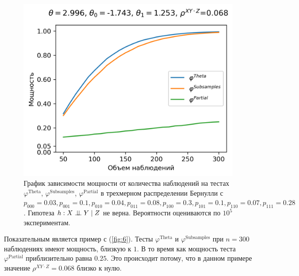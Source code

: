 \begin{figure}[H]
    \centering
    \includegraphics[scale=0.6]{images/graph6.png}
    \caption{График зависимости мощности от количества наблюдений
    на тестах $\varphi^{\text{Theta}}$, $\varphi^{\text{Subsamples}}$, $\varphi^{\text{Partial}}$
    в трехмерном распределении Бернулли с $p_{000}=0.03, p_{001}=0.1, 
    p_{010}=0.04, p_{011}=0.08,
    p_{100}=0.3, p_{101}=0.1, p_{110}=0.07, p_{111}=0.28$. 
    Гипотеза $h: X \perp\!\!\!\perp Y \mid Z$ не верна.
    Вероятности оцениваются по $10^5$ экспериментам.} \label{fig:6}
\end{figure}

Показательным является пример с (\autoref{fig:6}). Тесты 
$\varphi^{\text{Theta}}$ и $\varphi^{\text{Subsamples}}$ при $n=300$
наблюдениях имеют мощность, близкую к $1$. В то время как мощность
теста $\varphi^{\text{Partial}}$ приблизительно равна $0.25$. Это происходит потому, что
в данном примере значение $\rho^{XY\cdot Z}=0.068$ близко к нулю.

